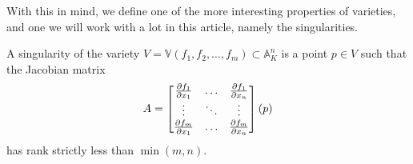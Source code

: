 \documentclass{article}
\newcommand{\A}{\ensuremath{\mathbb{A}}}
\newcommand{\V}{\ensuremath{\mathbb{V}}}
\begin{document}
    With this in mind, we define one of the more interesting properties of
    varieties, and one we will work with a lot in this article, namely the
    singularities.
    \begin{definition}
        A singularity of the variety $V = \V(f_1, f_2, \ldots, f_m) \subset
        \A_K^n$ is a point $p \in V$ such that the Jacobian matrix
        \begin{equation}
            \notag
            A = \begin{bmatrix}
                \frac{\partial f_1}{\partial x_1} & \hdots & \frac{\partial f_1}{\partial x_n} \\
                \vdots & \ddots & \vdots \\
                \frac{\partial f_m}{\partial x_1} & \hdots & \frac{\partial f_m}{\partial x_n}
            \end{bmatrix}(p)
        \end{equation}
        has rank strictly less than $\min(m, n)$.
    \end{definition}
\end{document}
